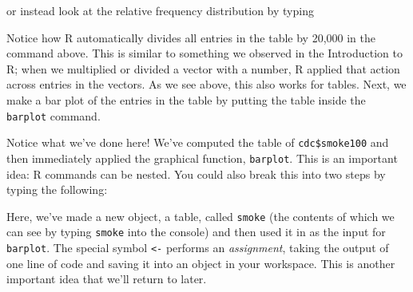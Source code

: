 \documentclass[]{article}
\newenvironment{Shaded}{\begin{snugshade}}{\end{snugshade}}
\newcommand{\KeywordTok}[1]{\textcolor[rgb]{0.13,0.29,0.53}{\textbf{{#1}}}}
\newcommand{\DecValTok}[1]{\textcolor[rgb]{0.00,0.00,0.81}{{#1}}}
\newcommand{\StringTok}[1]{\textcolor[rgb]{0.31,0.60,0.02}{{#1}}}
\newcommand{\NormalTok}[1]{{#1}}
\begin{document}
\begin{Shaded}
\end{Shaded}

or instead look at the relative frequency distribution by typing

\begin{Shaded}
\end{Shaded}

Notice how R automatically divides all entries in the table by 20,000 in
the command above. This is similar to something we observed in the
Introduction to R; when we multiplied or divided a vector with a number,
R applied that action across entries in the vectors. As we see above,
this also works for tables. Next, we make a bar plot of the entries in
the table by putting the table inside the \texttt{barplot} command.

\begin{Shaded}
\end{Shaded}

Notice what we've done here! We've computed the table of
\texttt{cdc\$smoke100} and then immediately applied the graphical
function, \texttt{barplot}. This is an important idea: R commands can be
nested. You could also break this into two steps by typing the
following:

\begin{Shaded}
\end{Shaded}

Here, we've made a new object, a table, called \texttt{smoke} (the
contents of which we can see by typing \texttt{smoke} into the console)
and then used it in as the input for \texttt{barplot}. The special
symbol \texttt{\textless{}-} performs an \emph{assignment}, taking the
output of one line of code and saving it into an object in your
workspace. This is another important idea that we'll return to later.
\end{document}
